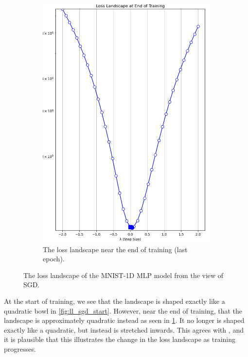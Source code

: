 \begin{figure}[!t]
\begin{subfigure}[b]{0.49\linewidth}
        \centering
        \includegraphics[width=\linewidth, height=0.4\textheight]{figures/5evals/ll_sgd_end.png}
        \caption{The loss landscape near the end of training (last epoch).}
        \label{fig:ll_sgd_end}
    \end{subfigure}
    \caption{The loss landscape of the MNIST-1D MLP model from the view of SGD.}
    \label{fig:ll_landscape}
\end{figure}

At the start of training, we see that the landscape is shaped exactly like a quadratic bowl in \cref{fig:ll_sgd_start}. However, near the end of training, that the landscape is approximately quadratic instead as seen in \cref{fig:ll_sgd_end}. It no longer is shaped exactly like a quadratic, but instead is stretched inwards. This agrees with \cite{ma2022beyond}, and it is plausible that this illustrates the change in the loss landscape as training progresses.

